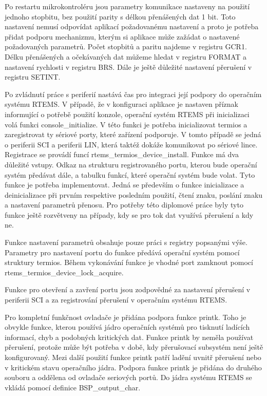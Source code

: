 Po restartu mikrokontroléru jsou parametry komunikace nastaveny na použití jednoho stopbitu, bez použití parity s délkou přenášených dat 1 bit.
Toto nastavení nemusí odpovídat aplikací požadovanému nastavení a proto je potřeba přidat podporu mechanizmu, kterým si aplikace může zažádat o nastavené požadovaných parametrů.
Počet stopbitů a paritu najdeme v registru GCR1.
Délku přenášených a očekávaných dat můžeme hledat v registru FORMAT a nastavení rychlosti v registru BRS.
Dále je ještě důležité nastavení přerušení v registru SETINT.

Po zvládnutí práce s periferií nastává čas pro integraci její podpory do operačním systému RTEMS.
V případě, že v konfiguraci aplikace je nastaven příznak informující o potřebě použití konzole, operační systém RTEMS při inicializaci volá funkci console\_initialize.
V této funkci je potřeba inicializovat termios a zaregistrovat ty sériové porty, které zařízení podporuje.
V tomto případě se jedná o periferii SCI a periferii LIN, která taktéž dokáže komunikovat po sériové lince.
Registrace se provádí funcí rtems\_termios\_device\_install.
Funkce má dva důležité vstupy.
Odkaz na strukturu registrovaného portu, kterou bude operační systém předávat dále, a tabulku funkcí, které operační systém bude volat.
Tyto funkce je potřeba implementovat.
Jedná se především o funkce inicializace a deinicializace při prvním respektive posledním použití, čtení znaku, poslání znaku a nastavení parametrů přenosu.
Pro potřeby této diplomové práce byly tyto funkce ještě rozvětveny na případy, kdy se pro tok dat využívá přerušení a kdy ne.

Funkce nastavení parametrů obsahuje pouze práci s registry popsanými výše.
Parametry pro nastavení portu do funkce předává operační systém pomocí struktury termios.
Během vykonávání funkce je vhodné port zamknout pomocí rtems\_termios\_device\_lock\_acquire.

Funkce pro otevření a zavření portu jsou zodpovědné za nastavení přerušení v periferii SCI a za registrování přerušení v operačním systému RTEMS.

Pro kompletní funkčnost ovladače je přidána podpora funkce printk.
Toho je obvykle funkce, kterou používá jádro operačních systémů pro tisknutí ladících informací, chyb a podobných kritických dat.
Funkce printk by neměla používat přerušení, protože může být potřeba v době, kdy přerušovací subsystém není ještě konfigurovaný.
Mezi další použití funkce printk patří ladění uvnitř přerušení nebo v kritickém stavu operačního jádra.
Podpora funkce printk je přidána do druhého souboru a oddělena od ovladače seriových portů.
Do jádra systému RTEMS se vkládá pomocí definice BSP\_output\_char.

